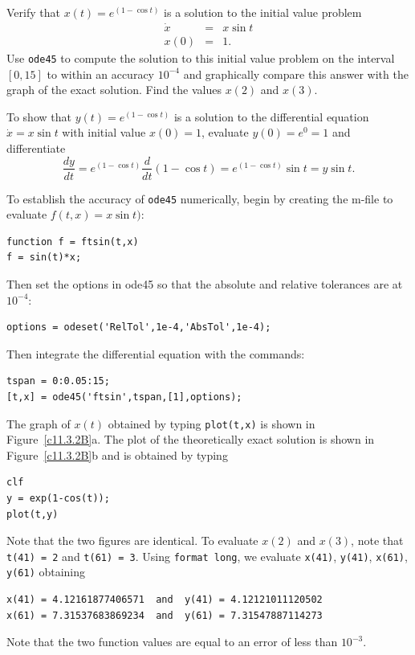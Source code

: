 \documentclass{ximera}
\begin{document}
\begin{computerExercise}  \label{c11.3.2B}
Verify that $x(t) = e^{(1-\cos t)}$ is a solution to the initial value problem
\[
\begin{array}{rcl}
\dot{x} & = & x\sin t \\
x(0) & = & 1.
\end{array}
\]
Use {\tt ode45} to compute the solution to this initial value problem on the
interval $[0,15]$ to within an accuracy $10^{-4}$ and graphically compare 
this answer with the graph of the exact solution.  Find the values $x(2)$ 
and $x(3)$. 

\begin{solution}

To show that $y(t)=e^{(1-\cos t)}$ is a solution to the differential equation
$\dot{x}=x\sin t$ with initial value $x(0)=1$, evaluate $y(0)=e^0=1$ and
differentiate
\[
\frac{dy}{dt} = e^{(1-\cos t)}\frac{d}{dt}(1-\cos t) = 
e^{(1-\cos t)}\sin t = y\sin t.
\]

To establish the accuracy of {\tt ode45} numerically, begin by creating the 
m-file to evaluate $f(t,x)=x\sin t)$:
\begin{verbatim}
function f = ftsin(t,x)
f = sin(t)*x;
\end{verbatim}
Then set the options in {\sf ode45} so that the absolute and relative
tolerances are at $10^{-4}$:
\begin{verbatim}
options = odeset('RelTol',1e-4,'AbsTol',1e-4);
\end{verbatim}
Then integrate the differential equation with the commands:
\begin{verbatim}
tspan = 0:0.05:15;
[t,x] = ode45('ftsin',tspan,[1],options);
\end{verbatim}
The graph of $x(t)$ obtained by typing {\tt plot(t,x)} is shown in
Figure~\ref{c11.3.2B}a.  The plot of the theoretically exact solution
is shown in Figure~\ref{c11.3.2B}b and is obtained by typing
\begin{verbatim}
clf
y = exp(1-cos(t));
plot(t,y)
\end{verbatim}
Note that the two figures are identical.  To evaluate $x(2)$ and $x(3)$,
note that {\tt t(41) = 2} and {\tt t(61) = 3}.  Using {\tt format long}, we
evaluate {\tt x(41)}, {\tt y(41)}, {\tt x(61)}, {\tt y(61)} obtaining
\begin{verbatim}
x(41) = 4.12161877406571  and  y(41) = 4.12121011120502
x(61) = 7.31537683869234  and  y(61) = 7.31547887114273
\end{verbatim}
Note that the two function values are equal to an error of less than 
$10^{-3}$.


\end{solution}
\end{computerExercise}
\end{document}
